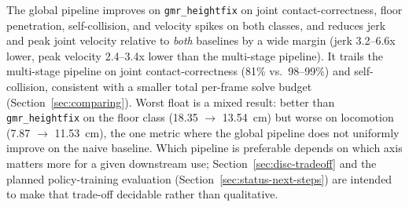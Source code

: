 The global pipeline improves on \texttt{gmr\_heightfix} on joint
contact-correctness, floor penetration, self-collision, and velocity spikes
on both classes, and reduces jerk and peak joint velocity relative to
\textit{both} baselines by a wide margin (jerk 3.2--6.6x lower, peak
velocity 2.4--3.4x lower than the multi-stage pipeline). It trails the
multi-stage pipeline on joint contact-correctness (81\% vs.\ 98--99\%) and
self-collision, consistent with a smaller total per-frame solve budget
(Section~\ref{sec:comparing}). Worst float is a mixed result: better than
\texttt{gmr\_heightfix} on the floor class (18.35 $\to$ 13.54~cm) but worse
on locomotion (7.87 $\to$ 11.53~cm), the one metric where the global
pipeline does not uniformly improve on the naive baseline. Which pipeline
is preferable depends on which axis matters more for a given downstream
use; Section~\ref{sec:disc-tradeoff} and the planned policy-training
evaluation (Section~\ref{sec:status-next-steps}) are intended to make that
trade-off decidable rather than qualitative.
